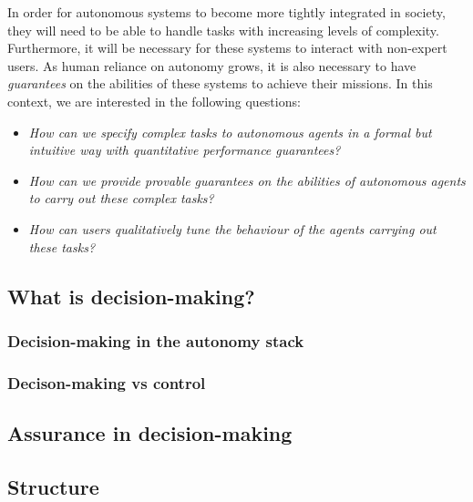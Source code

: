 In order for autonomous systems to become more tightly integrated in society, they will need to be able to handle tasks with increasing levels of complexity. Furthermore, it will be necessary for these systems to interact with non-expert users. As human reliance on autonomy grows, it is also necessary to have \emph{guarantees} on the abilities of these systems to achieve their missions. In this context, we are interested in the following questions:
\begin{itemize}
	\item \emph{How can we specify complex tasks to autonomous agents in a formal but intuitive way with quantitative performance guarantees?}
	\item \emph{How can we provide provable guarantees on the abilities of autonomous agents to carry out these complex tasks?}
	\item \emph{How can users qualitatively tune the behaviour of the agents carrying out these tasks?}
\end{itemize}

\subsection{What is decision-making?}

\subsubsection{Decision-making in the autonomy stack}

\subsubsection{Decison-making vs control}

\subsection{Assurance in decision-making}

\subsection{Structure}


